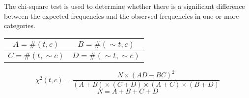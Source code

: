 \begin{multicols*}{2}
\noindent The chi-square test is used to determine whether there is a significant difference between the expected frequencies and the observed frequencies in one or more categories. 

\begin{center}
\begin{tabular}{ |c|c| } 
    \hline
    $A = \#(t,c)$ & $B = \#(\sim t,c)$ \\
    \hline 
    $C = \#(t,\sim c)$ & $D = \#(\sim t,\sim c)$ \\
    \hline
\end{tabular}
\end{center}

$$\chi^2(t,c) = \frac{N\times (AD - BC)^2}{(A+B) \times (C+D) \times (A+C) \times (B+D)}$$
$$N=A+B+C+D$$

\end{multicols*}
